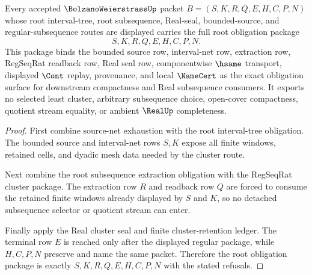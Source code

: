 \begin{theorem}
\label{thm:bolzano-weierstrass-root-obligation-package}
Every accepted $\BolzanoWeierstrassUp$ packet $B=(S,K,R,Q,E,H,C,P,N)$ whose root interval-tree, root subsequence, Real-seal, bounded-source, and regular-subsequence routes are displayed carries the full root obligation package
$$
S,K,R,Q,E,H,C,P,N .
$$
This package binds the bounded source row, interval-net row, extraction row, RegSeqRat readback row, Real seal row, componentwise $\hsame$ transport, displayed $\Cont$ replay, provenance, and local $\NameCert$ as the exact obligation surface for downstream compactness and Real subsequence consumers. It exports no selected least cluster, arbitrary subsequence choice, open-cover compactness, quotient stream equality, or ambient $\RealUp$ completeness.
\end{theorem}
\begin{proof}
First combine source-net exhaustion with the root interval-tree obligation. The bounded source and interval-net rows $S,K$ expose all finite windows, retained cells, and dyadic mesh data needed by the cluster route.

Next combine the root subsequence extraction obligation with the RegSeqRat cluster package. The extraction row $R$ and readback row $Q$ are forced to consume the retained finite windows already displayed by $S$ and $K$, so no detached subsequence selector or quotient stream can enter.

Finally apply the Real cluster seal and finite cluster-retention ledger. The terminal row $E$ is reached only after the displayed regular package, while $H,C,P,N$ preserve and name the same packet. Therefore the root obligation package is exactly $S,K,R,Q,E,H,C,P,N$ with the stated refusals.
\end{proof}





